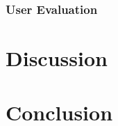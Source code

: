   \subsubsection{User Evaluation}



\section{Discussion}
\label{section:Discussion}




\section{Conclusion}
\label{section:Conclusion}


